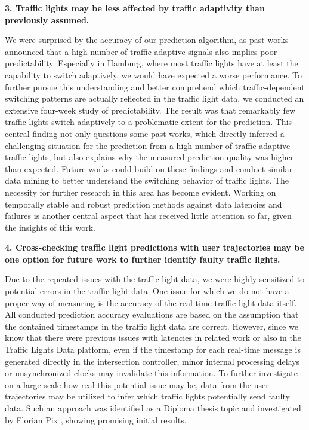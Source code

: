 \textbf{\color{cidarkblue}3. Traffic lights may be less affected by traffic adaptivity than previously assumed.} 

We were surprised by the accuracy of our prediction algorithm, as past works announced that a high number of traffic-adaptive signals also implies poor predictability. Especially in Hamburg, where most traffic lights have at least the capability to switch adaptively, we would have expected a worse performance. To further pursue this understanding and better comprehend which traffic-dependent switching patterns are actually reflected in the traffic light data, we conducted an extensive four-week study of predictability. The result was that remarkably few traffic lights switch adaptively to a problematic extent for the prediction. This central finding not only questions some past works, which directly inferred a challenging situation for the prediction from a high number of traffic-adaptive traffic lights, but also explains why the measured prediction quality was higher than expected. Future works could build on these findings and conduct similar data mining to better understand the switching behavior of traffic lights. The necessity for further research in this area has become evident. Working on temporally stable and robust prediction methods against data latencies and failures is another central aspect that has received little attention so far, given the insights of this work.

\textbf{\color{cidarkblue}4. Cross-checking traffic light predictions with user trajectories may be one option for future work to further identify faulty traffic lights.} 

Due to the repeated issues with the traffic light data, we were highly sensitized to potential errors in the traffic light data. One issue for which we do not have a proper way of measuring is the accuracy of the real-time traffic light data itself. All conducted prediction accuracy evaluations are based on the assumption that the contained timestamps in the traffic light data are correct. However, since we know that there were previous issues with latencies in related work or also in the Traffic Lights Data platform, even if the timestamp for each real-time message is generated directly in the intersection controller, minor internal processing delays or unsynchronized clocks may invalidate this information. To further investigate on a large scale how real this potential issue may be, data from the user trajectories may be utilized to infer which traffic lights potentially send faulty data. Such an approach was identified as a Diploma thesis topic and investigated by Florian Pix \cite{pix_2024}, showing promising initial results.

